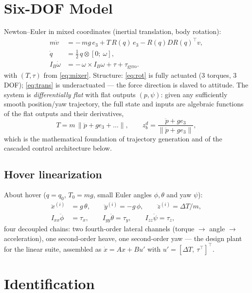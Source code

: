 \documentclass[conference]{IEEEtran}
\begin{document}
\section{Six-DOF Model}
Newton--Euler in mixed coordinates (inertial translation, body rotation):
\begin{align}
m\dot v &= -\,m g\,e_3 + T\,R(q)\,e_3 - R(q) D R(q)^{\!\top} v, \label{eq:trans}\\
\dot q &= \tfrac12\, q\otimes [0;\ \omega], \label{eq:quatkin}\\
I_B\dot\omega &= -\,\omega\times I_B\omega + \tau + \tau_{\mathrm{gyro}}. \label{eq:rot}
\end{align}
with $(T,\tau)$ from \eqref{eq:mixer}. Structure: \eqref{eq:rot} is fully actuated (3 torques, 3 DOF); \eqref{eq:trans} is underactuated --- the force direction is slaved to attitude. The system is \emph{differentially flat} with flat outputs $(p, \psi)$: given any sufficiently smooth position/yaw trajectory, the full state and inputs are algebraic functions of the flat outputs and their derivatives,
\begin{equation}
T = m\,\|\ddot p + g e_3 + \ldots\|,\qquad
z_b^d = \frac{\ddot p + g e_3}{\|\ddot p + g e_3\|},
\label{eq:flat}
\end{equation}
which is the mathematical foundation of trajectory generation and of the cascaded control architecture below.

\subsection{Hover linearization}
About hover ($q = q_0$, $T_0 = mg$, small Euler angles $\phi,\theta$ and yaw $\psi$):
\begin{align}
\ddot x^{(i)} &= g\,\theta,\qquad \ddot y^{(i)} = -g\,\phi,\qquad \ddot z^{(i)} = \Delta T/m,\nonumber\\
I_{xx}\ddot\phi &= \tau_x,\qquad I_{yy}\ddot\theta = \tau_y,\qquad I_{zz}\ddot\psi = \tau_z,
\label{eq:hoverlin}
\end{align}
four decoupled chains: two fourth-order lateral channels (torque $\to$ angle $\to$ acceleration), one second-order heave, one second-order yaw --- the design plant for the linear suite, assembled as $\dot x = Ax + Bu'$ with $u' = [\Delta T,\ \tau^{\!\top}]^{\!\top}$.

\section{Identification}
\end{document}
